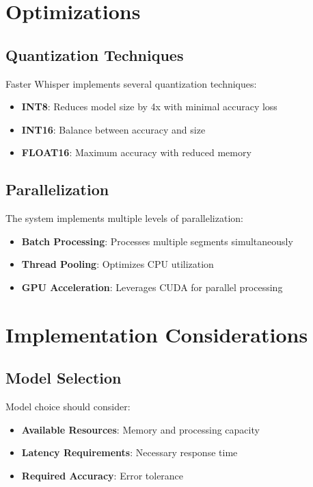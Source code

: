 \section{Optimizations}
\label{sec:optimizations}

\subsection{Quantization Techniques}
\label{subsec:quantization}

Faster Whisper implements several quantization techniques:

\begin{itemize}
	\item \textbf{INT8}: Reduces model size by 4x with minimal accuracy loss
	\item \textbf{INT16}: Balance between accuracy and size
	\item \textbf{FLOAT16}: Maximum accuracy with reduced memory
\end{itemize}

\subsection{Parallelization}
\label{subsec:parallelization}

The system implements multiple levels of parallelization:

\begin{itemize}
	\item \textbf{Batch Processing}: Processes multiple segments simultaneously
	\item \textbf{Thread Pooling}: Optimizes CPU utilization
	\item \textbf{GPU Acceleration}: Leverages CUDA for parallel processing
\end{itemize}

\section{Implementation Considerations}
\label{sec:implementation-considerations}

\subsection{Model Selection}
Model choice should consider:

\begin{itemize}
	\item \textbf{Available Resources}: Memory and processing capacity
	\item \textbf{Latency Requirements}: Necessary response time
	\item \textbf{Required Accuracy}: Error tolerance
\end{itemize}

